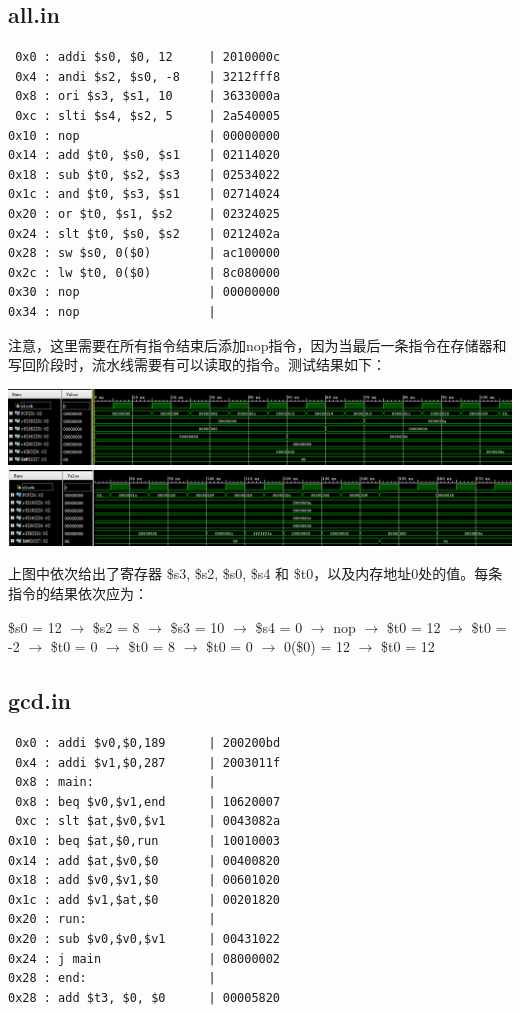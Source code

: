 \documentclass[12pt]{article} %
\begin{document}
\begin{sloppypar}
\subsection{all.in}

\begin{lstlisting}
 0x0 : addi $s0, $0, 12     | 2010000c
 0x4 : andi $s2, $s0, -8    | 3212fff8
 0x8 : ori $s3, $s1, 10     | 3633000a
 0xc : slti $s4, $s2, 5     | 2a540005
0x10 : nop                  | 00000000
0x14 : add $t0, $s0, $s1    | 02114020
0x18 : sub $t0, $s2, $s3    | 02534022
0x1c : and $t0, $s3, $s1    | 02714024
0x20 : or $t0, $s1, $s2     | 02324025
0x24 : slt $t0, $s0, $s2    | 0212402a
0x28 : sw $s0, 0($0)        | ac100000
0x2c : lw $t0, 0($0)        | 8c080000
0x30 : nop                  | 00000000
0x34 : nop                  | 
\end{lstlisting} 

注意，这里需要在所有指令结束后添加nop指令，因为当最后一条指令在存储器和写回阶段时，流水线需要有可以读取的指令。测试结果如下：

\noindent
\includegraphics[width =\linewidth]{figure/all1.png}
\includegraphics[width =\linewidth]{figure/all2.png}

上图中依次给出了寄存器 \$s3, \$s2, \$s0, \$s4 和 \$t0，以及内存地址0处的值。每条指令的结果依次应为：

\$s0 = 12 $\rightarrow$
\$s2 = 8 $\rightarrow$
\$s3 = 10 $\rightarrow$
\$s4 = 0 $\rightarrow$
nop $\rightarrow$
\$t0 = 12 $\rightarrow$
\$t0 = -2 $\rightarrow$
\$t0 = 0 $\rightarrow$
\$t0 = 8 $\rightarrow$
\$t0 = 0 $\rightarrow$
0(\$0) = 12 $\rightarrow$
\$t0 = 12


\subsection{gcd.in}

\begin{lstlisting}
 0x0 : addi $v0,$0,189      | 200200bd
 0x4 : addi $v1,$0,287      | 2003011f
 0x8 : main:                | 
 0x8 : beq $v0,$v1,end      | 10620007
 0xc : slt $at,$v0,$v1      | 0043082a
0x10 : beq $at,$0,run       | 10010003
0x14 : add $at,$v0,$0       | 00400820
0x18 : add $v0,$v1,$0       | 00601020
0x1c : add $v1,$at,$0       | 00201820
0x20 : run:                 | 
0x20 : sub $v0,$v0,$v1      | 00431022
0x24 : j main               | 08000002
0x28 : end:                 | 
0x28 : add $t3, $0, $0      | 00005820


\end{lstlisting}
\end{sloppypar}
\end{document}
